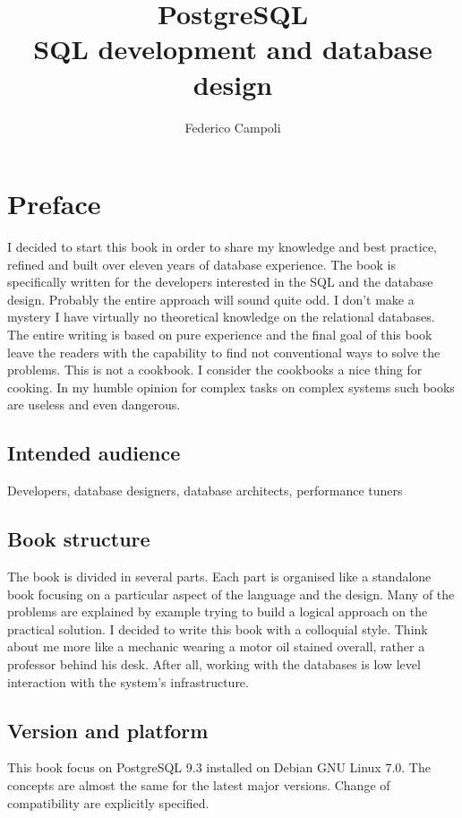 \documentclass[oneside]{book}
\author{Federico Campoli}
\title{PostgreSQL  \\ SQL development and database design}
\begin{document}
\maketitle

\newpage{}



\tableofcontents{}

\chapter*{Preface}
I decided to start this book in order to share my knowledge and best practice, refined and built
over eleven years of database experience. The book is specifically written for the developers
interested in the SQL and the database design. Probably the entire approach will sound quite odd. I
don't make a mystery I have virtually no theoretical knowledge on the relational databases. The
entire writing is based on pure experience and the final goal of this book leave the readers with
the capability to find not conventional ways to solve the problems. This is not a cookbook.
I consider the cookbooks a nice thing for cooking. In my humble opinion for complex tasks on
complex systems such books are useless and even dangerous. 


\section*{Intended audience}
Developers, database designers, database architects, performance tuners

\section*{Book structure}
The book is divided in several parts. Each part is organised like a standalone book focusing
on a particular aspect of the language and the design. Many of the problems are
explained by example trying to build a logical approach on the practical solution. I decided to
write this book with a colloquial style. Think about me more like a mechanic wearing a motor
oil stained overall, rather a professor behind his desk. After all, working with the databases is
low level interaction with the system's infrastructure. \newline



\section*{Version and platform}
This book focus on PostgreSQL 9.3 installed on Debian GNU Linux 7.0. The concepts are almost the
same for the latest major versions. Change of compatibility are explicitly specified.
\end{document}
